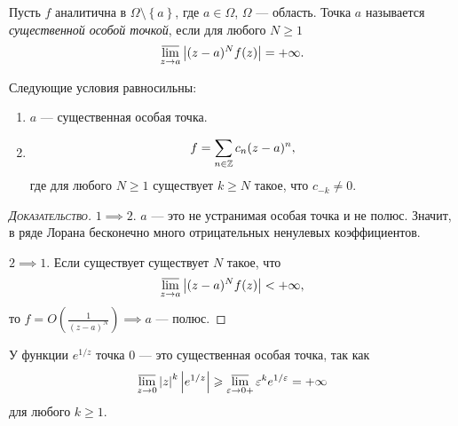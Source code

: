 \documentclass[../complex-analysis.tex]{subfiles}
\begin{document}
\begin{df}
 Пусть $ f $ аналитична в $ \Omega \setminus \left\{ a \right\} $, где $ a \in \Omega $, $ \Omega $ --- область. Точка $ a $ называется \textit{существенной особой точкой}, если для любого $ N \geqslant 1 $
 \begin{align*}
  \varlimsup_{z \to a} \left|(z-a)^{N}f(z) \right| = +\infty.
 \end{align*}
\end{df}
\begin{thm}
 Следующие условия равносильны:
 \begin{enumerate}
  \item $ a $ --- существенная особая точка.
  \item
   \begin{align*}
    f = \sum_{n \in \mathbb{Z}} c_n(z-a)^{n},
   \end{align*} где для любого $ N \geqslant 1 $ существует $ k \geqslant N $ такое, что $ c_{-k} \neq 0 $.
 \end{enumerate}
\end{thm}
\begin{proof}[\normalfont\textsc{Доказательство}]
 $ 1 \implies 2 $. $ a $ --- это не устранимая особая точка и не полюс. Значит, в ряде Лорана бесконечно много отрицательных ненулевых коэффициентов.

 $ 2 \implies 1 $. Если существует существует $ N $ такое, что
 \begin{align*}
  \varlimsup_{z \to a} \left| (z-a)^{N}f(z) \right| < +\infty,
 \end{align*} то $ f = O(\frac{1}{(z-a)^{N}}) \implies a $ --- полюс.
\end{proof}

\begin{exmpl}
 У функции $ e^{1 / z} $ точка $ 0 $ --- это существенная особая точка, так как
 \begin{align*}
  \varlimsup_{z \to 0} \left| z \right|^{k} \left| e^{1/z} \right| \geqslant \varlimsup_{\varepsilon \to 0+} \varepsilon^{k} e^{1 / \varepsilon} = +\infty
 \end{align*} для любого $ k \geqslant 1 $.
\end{exmpl}
\end{document}
